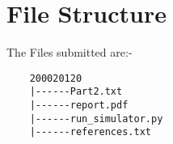 \documentclass[10pt]{article}
\begin{document}
\section{File Structure }
The Files submitted are:-
\begin{verbatim}
    200020120
    |------Part2.txt
    |------report.pdf
    |------run_simulator.py
    |------references.txt
\end{verbatim}
\end{document}
